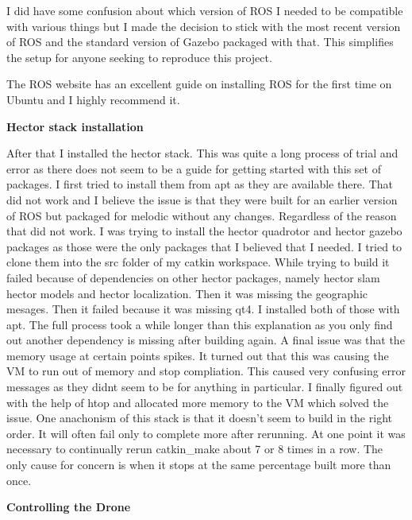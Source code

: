\documentclass[]{../resources/final_report}
\begin{document}
\pagebreak
I did have some confusion about which version of ROS I needed to be compatible with various things but I made the decision to stick with the most recent version of ROS and the standard version of Gazebo packaged with that. This simplifies the setup for anyone seeking to reproduce this project.

The ROS website\cite{melodic/installation/ubuntu} has an excellent guide on installing ROS for the first time on Ubuntu and I highly recommend it.

\textbf{Hector stack installation}

After that I installed the hector stack. This was quite a long process of trial and error as there does not seem to be a guide for getting started with this set of packages. I first tried to install them from apt as they are available there. That did not work and I believe the issue is that they were built for an earlier version of ROS but packaged for melodic without any changes. Regardless of the reason that did not work. I was trying to install the hector quadrotor and hector gazebo packages as those were the only packages that I believed that I needed. I tried to clone them into the src folder of my catkin workspace. While trying to build it failed because of dependencies on other hector packages, namely hector slam hector models and hector localization. Then it was missing the geographic mesages. Then it failed because it was missing qt4. I installed both of those with apt. The full process took a while longer than this explanation as you only find out another dependency is missing after building again. A final issue was that the memory usage at certain points spikes. It turned out that this was causing the VM to run out of memory and stop compliation. This caused very confusing error messages as they didnt seem to be for anything in particular. I finally figured out with the help of htop and allocated more memory to the VM which solved the issue. One anachonism of this stack is that it doesn't seem to build in the right order. It will often fail only to complete more after rerunning. At one point it was necessary to continually rerun catkin\_make about 7 or 8 times in a row. The only cause for concern is when it stops at the same percentage built more than once. 

\textbf{Controlling the Drone}
\end{document}
